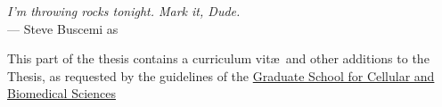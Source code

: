 \label{ch:cv}
\begin{flushright}{\slshape I'm throwing rocks tonight. Mark it, Dude.} \\ \medskip
    --- Steve Buscemi as \citep{TheBigLebowski}
\end{flushright}

This part of the thesis contains a curriculum vit\ae\ and other additions to the Thesis, as requested by the guidelines of the \href{http://www.gcb.unibe.ch/content/programme_description/phd_programme/phd_degree/index_eng.html}{Graduate School for Cellular and Biomedical Sciences}



\cleardoublepage